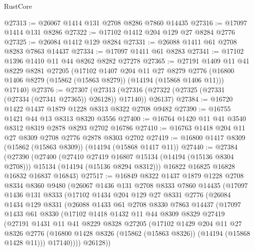 \begin{lexlean}{RustCore}
\begin{coremodule}
@27313 := @26067 @1414 @131 @2708 @8286 @7860 @14435
@27316 := @17097 @1414 @131 @8286
@27322 := @17102 @1412 @204 @129 @27 @8284 @2776
@27325 := @26084 @1412 @129 @8284
@27331 := @26088 @1411 @61 @2708 @8283 @7863 @14437
@27334 := @17097 @1411 @61 @8283
@27341 := @17102 @1396 @1410 @11 @44 @8262 @8282 @27278
@27365 := @27191
    @1409
    @11
    @41
    @8229
    @8281
    @27205
    (@17102
      @1407
      @204
      @11
      @27
      @8279
      @2776
      (@16800 @1406 @8279 (@15862 (@15863 @8279)) (@14194 (@15868 @1406 @11)))
      @17140)
@27376 := @27307
    (@27313 (@27316 (@27322 (@27325 (@27331 (@27334 (@27341 @27365)) @26128)) @17140)) @26137)
@27384 := @16720 @1422 @1437 @1879 @1228 @8313 @8322 @2708 @9482
@27390 := @16755 @1421 @44 @13 @8313 @8320 @3556
@27400 := @16764 @1420 @11 @41 @3540 @8312 @8319 @2878 @8293 @2702 @16786
@27410 := @16763 @1418 @204 @11 @27 @8309 @2708 @2776 @2878 @8303 @2702
@27419 := @16800 @1417 @8309 (@15862 (@15863 @8309)) (@14194 (@15868 @1417 @11))
@27440 := @27384
    (@27390
      (@27400
        (@27410 @27419 @16807 @15134 (@14194 (@15136 @8304 @2708)))
        @15134
        (@14194 (@15136 @8294 @8312)))
      @16822
      @16825
      @16828
      @16832
      @16837
      @16843)
@27517 := @16849
    @8322
    @1437
    @1879
    @1228
    @2708
    @8334
    @8360
    @9480
    (@26067
      @1436
      @131
      @2708
      @8333
      @7860
      @14435
      (@17097
        @1436
        @131
        @8333
        (@17102
          @1434
          @204
          @129
          @27
          @8331
          @2776
          (@26084
            @1434
            @129
            @8331
            (@26088
              @1433
              @61
              @2708
              @8330
              @7863
              @14437
              (@17097
                @1433
                @61
                @8330
                (@17102
                  @1418
                  @1432
                  @11
                  @44
                  @8309
                  @8329
                  @27419
                  (@27191
                    @1431
                    @11
                    @41
                    @8229
                    @8328
                    @27205
                    (@17102
                      @1429
                      @204
                      @11
                      @27
                      @8326
                      @2776
                      (@16800 @1428 @8326 (@15862 (@15863 @8326)) (@14194 (@15868 @1428 @11)))
                      @17140))))
              @26128))

\end{coremodule}
\end{lexlean}
